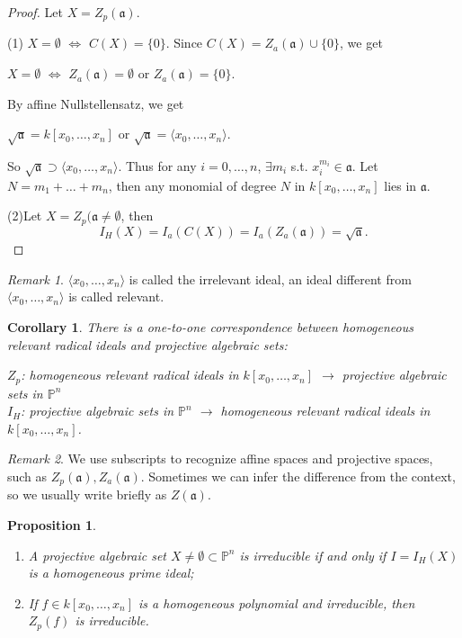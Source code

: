 \documentclass{amsart}
\theoremstyle{plain}
\newtheorem{corollary}{Corollary}
\newtheorem{proposition}{Proposition}
\theoremstyle{definition}
\theoremstyle{remark}
\newtheorem*{remark}{Remark}
\numberwithin{equation}{section}
\begin{document}
\begin{proof}
	Let $ X=Z_p(\mathfrak{a}) $.

	(1) $ X=\emptyset $ $ \Leftrightarrow $ $ C(X)=\{ 0 \} $. Since $ C(X)=Z_a(\mathfrak{a})\cup \{0\} $, we get
	\begin{center}
		$ X=\emptyset $ $ \Leftrightarrow $ $ Z_a(\mathfrak{a})=\emptyset $ or $ Z_a(\mathfrak{a})=\{0\} $.
	\end{center}
	By affine Nullstellensatz, we get
	\begin{center}
		$ \sqrt{\mathfrak{a}}=k[x_0,\dots,x_n] $ or $ \sqrt{\mathfrak{a}}=\langle x_0,\dots,x_n\rangle $.
	\end{center}
	So $ \sqrt{\mathfrak{a}}\supset \langle x_0,\dots,x_n\rangle $. Thus for any $ i=0,\dots,n $, $ \exists m_i $ s.t. $ x_i^{m_i}\in \mathfrak{a} $. Let $ N=m_1+\dots+m_n $, then any monomial of degree $ N $ in $ k[x_0,\dots,x_n] $ lies in $ \mathfrak{a} $.

	(2)Let $ X=Z_p(\mathfrak{a}\neq \emptyset $, then
		\begin{equation}
		I_H(X)=I_a(C(X))=I_a(Z_a(\mathfrak{a}))=\sqrt{\mathfrak{a}}.
		\end{equation}
\end{proof}
\begin{remark}
	$ \langle x_0,\dots,x_n \rangle $ is called the irrelevant ideal, an ideal different from $ \langle x_0,\dots,x_n \rangle $ is called relevant.
\end{remark}
\begin{corollary}
	There is a one-to-one correspondence between homogeneous relevant radical ideals and projective algebraic sets:
	\begin{center}
		$ Z_p $: homogeneous relevant radical ideals in $ k[x_0,\dots,x_n] $ $ \to $  projective algebraic sets in  $ \mathbb{P}^n $\\
		$ I_H $: projective algebraic sets in $ \mathbb{P}^n $ $ \to $ homogeneous relevant radical ideals in $ k[x_0,\dots,x_n] $.
	\end{center}
\end{corollary}
\begin{remark}
	We use subscripts to recognize affine spaces and projective spaces, such as $ Z_p(\mathfrak{a}),Z_a(\mathfrak{a}) $. Sometimes we can infer the difference from the context, so we usually write briefly as $ Z(\mathfrak{a}) $.
\end{remark}
\begin{proposition}
	\begin{enumerate}
		\item A projective algebraic set $ X\neq \emptyset\subset \mathbb{P}^n $ is irreducible if and only if $ I=I_H(X) $ is a homogeneous prime ideal;
		\item If $ f\in k[x_0,\dots,x_n] $ is a homogeneous polynomial and irreducible, then $ Z_p(f) $ is irreducible.
	\end{enumerate}
\end{proposition}
\end{document}
